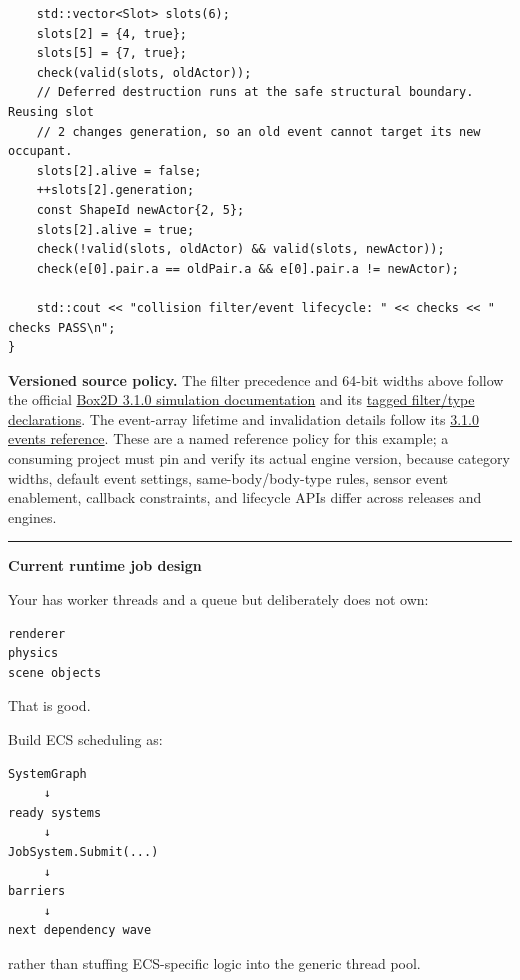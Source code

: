 \begin{verbatim}
    std::vector<Slot> slots(6);
    slots[2] = {4, true};
    slots[5] = {7, true};
    check(valid(slots, oldActor));
    // Deferred destruction runs at the safe structural boundary. Reusing slot
    // 2 changes generation, so an old event cannot target its new occupant.
    slots[2].alive = false;
    ++slots[2].generation;
    const ShapeId newActor{2, 5};
    slots[2].alive = true;
    check(!valid(slots, oldActor) && valid(slots, newActor));
    check(e[0].pair.a == oldPair.a && e[0].pair.a != newActor);

    std::cout << "collision filter/event lifecycle: " << checks << " checks PASS\n";
}
\end{verbatim}

\textbf{Versioned source policy.} The filter precedence and 64-bit widths above follow the official \href{https://raw.githubusercontent.com/erincatto/box2d/v3.1.0/docs/simulation.md}{Box2D 3.1.0 simulation documentation} and its \href{https://raw.githubusercontent.com/erincatto/box2d/v3.1.0/include/box2d/types.h}{tagged filter/type declarations}. The event-array lifetime and invalidation details follow its \href{https://raw.githubusercontent.com/erincatto/box2d/v3.1.0/include/box2d/box2d.h}{3.1.0 events reference}. These are a named reference policy for this example; a consuming project must pin and verify its actual engine version, because category widths, default event settings, same-body/body-type rules, sensor event enablement, callback constraints, and lifecycle APIs differ across releases and engines.

\begin{center}\rule{0.5\linewidth}{0.5pt}\end{center}

\textbf{Current runtime job design}

Your  has worker threads and a queue but deliberately does not own:

\begin{verbatim}
renderer
physics
scene objects
\end{verbatim}

That is good.

Build ECS scheduling as:

\begin{verbatim}
SystemGraph
     ↓
ready systems
     ↓
JobSystem.Submit(...)
     ↓
barriers
     ↓
next dependency wave
\end{verbatim}

rather than stuffing ECS-specific logic into the generic thread pool.

